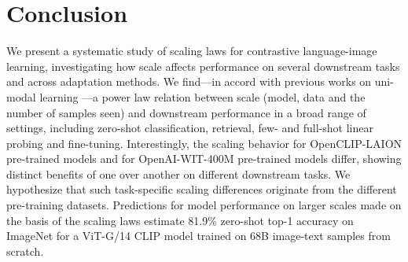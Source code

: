 \documentclass[11pt,table]{article}
\newcommand{\citep}{\cite}
\begin{document}

\section{Conclusion}

We present a systematic study of scaling laws for contrastive language-image learning, investigating how scale affects performance on several downstream tasks and across adaptation methods. We find---in accord with previous works on uni-modal learning \citep{Kaplan2020,Zhai2022scaling}---a power law relation between scale (model, data and the number of samples seen) and downstream performance in a broad range of settings, including zero-shot classification, retrieval, few- and full-shot linear probing and fine-tuning. Interestingly, the scaling behavior for OpenCLIP-LAION pre-trained models and for OpenAI-WIT-400M pre-trained models differ, showing distinct benefits of one over another on different downstream tasks. We hypothesize that such task-specific scaling differences originate from the different pre-training datasets. Predictions for model performance on larger scales made on the basis of the scaling laws estimate 81.9\% zero-shot top-1 accuracy on ImageNet for a ViT-G/14 CLIP model trained on 68B image-text samples from scratch.


\end{document}
